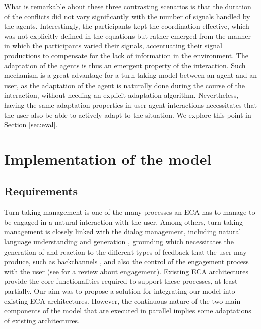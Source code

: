 \documentclass[twocolumn]{svjour3}
\begin{document}
What is remarkable about these three contrasting scenarios is that the duration of the conflicts did not vary significantly with the number of signals handled by the agents. Interestingly, the participants kept the coordination effective, which was not explicitly defined in the equations but rather emerged from the manner in which the participants varied their signals, accentuating their signal productions to compensate for the lack of information in the environment. The adaptation of the agents is thus an emergent property of the interaction. Such mechanism is a great advantage for a turn-taking model between an agent and an user, as the adaptation of the agent is naturally done during the course of the interaction, without needing an explicit adaptation algorithm. Nevertheless, having the same adaptation properties in user-agent interactions necessitates that the user also be able to actively adapt to the situation. We explore this point in Section \ref{sec:eval}.

\section{Implementation of the model}
\label{impl}

\subsection{Requirements}

Turn-taking management is one of the many processes an ECA has to manage to be engaged in a natural interaction with the user. 
Among others, turn-taking management is closely linked with 
the dialog management, including natural language understanding and generation \citep{skantze_towards_2010}, 
grounding which necessitates the generation of and reaction to the different types of feedback that the user may produce, such as backchannels \citep{kopp_dynamic_2014,bevacqua_multimodal_2010}, 
and also the control of the engagement process with the user (see \cite{clavel_fostering_2016} for a review about engagement). 
Existing ECA architectures provide the core functionalities required to support these processes, at least partially. 
Our aim was to propose a solution for integrating our model into existing ECA architectures.
However, the continuous nature of the two main components of the model that are executed in parallel implies some adaptations of existing architectures. 
\end{document}
